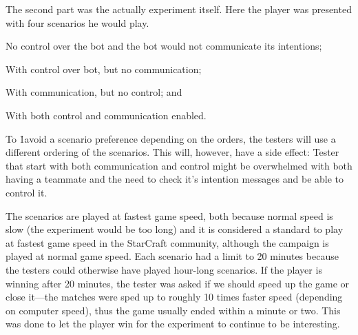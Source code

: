 The second part was the actually experiment itself. Here the player was presented with four scenarios he would play.
\begin{inparaenum}[1\upshape)]
	\item No control over the bot and the bot would not communicate its intentions;
	\item With control over bot, but no communication;
	\item With communication, but no control; and
	\item With both control and communication enabled.
\end{inparaenum}
To \h1{avoid a scenario preference depending} on the orders, the testers will use a different ordering of the scenarios. This will, however, have a side effect: Tester that start with both communication and control might be overwhelmed with both having a teammate and the need to check it’s intention messages and be able to control it.

The scenarios are played at fastest game speed, both because normal speed is slow (the experiment would be too long) and it is considered a standard to play at fastest game speed in the StarCraft community, although the campaign is played at normal game speed. Each scenario had a limit to 20 minutes because the testers could otherwise have played hour-long scenarios. If the player is winning after 20 minutes, the tester was asked if we should speed up the game or close it—the matches were sped up to roughly 10 times faster speed (depending on computer speed), thus the game usually ended within a minute or two. This was done to let the player win for the experiment to continue to be interesting.
